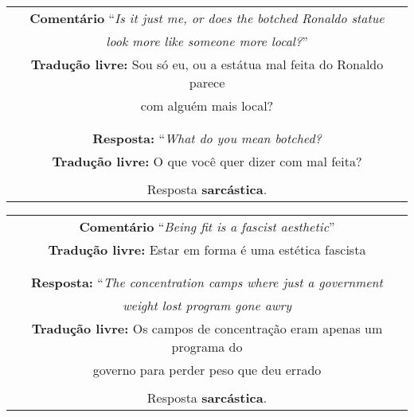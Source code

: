 \begin{center}
\begin{tabular}{|c|}

\hline

\textbf{Comentário} ``\textit{Is it just me, or does the botched Ronaldo statue} \\
\textit{look more like someone more local?}'' \\

\textbf{Tradução livre:} Sou só eu, ou a estátua mal feita do Ronaldo parece \\
com alguém mais local? \\ \\

\hline

\\

\textbf{Resposta:} ``\textit{What do you mean botched?} \\

\textbf{Tradução livre:} O que você quer dizer com mal feita? \\ \\

Resposta \textbf{sarcástica}.

\\ \hline

\end{tabular}
\end{center}

\begin{center}
\begin{tabular}{|c|}

\hline

\textbf{Comentário} ``\textit{Being fit is a fascist aesthetic}'' \\

\textbf{Tradução livre:} Estar em forma é uma estética fascista \\ \\

\hline

\\

\textbf{Resposta:} ``\textit{The concentration camps where just a government} \\
\textit{weight lost program gone awry} \\

\textbf{Tradução livre:} Os campos de concentração eram apenas um programa do \\
governo para perder peso que deu errado \\ \\

Resposta \textbf{sarcástica}.

\\ \hline

\end{tabular}
\end{center}

